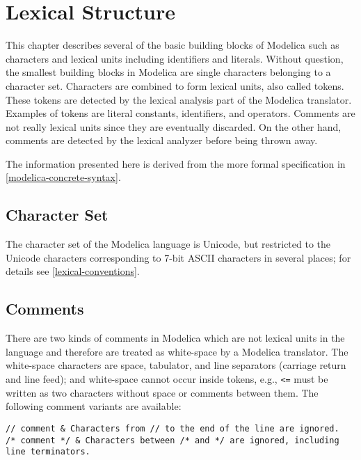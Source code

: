 \chapter{Lexical Structure}\label{lexical-structure}

This chapter describes several of the basic building blocks of Modelica
such as characters and lexical units including identifiers and literals.
Without question, the smallest building blocks in Modelica are single
characters belonging to a character set. Characters are combined to form
lexical units, also called tokens. These tokens are detected by the
lexical analysis part of the Modelica translator. Examples of tokens are
literal constants, identifiers, and operators. Comments are not really
lexical units since they are eventually discarded. On the other hand,
comments are detected by the lexical analyzer before being thrown away.

The information presented here is derived from the more formal
specification in \cref{modelica-concrete-syntax}.

\section{Character Set}\label{character-set}

The character set of the Modelica language is Unicode, but restricted to
the Unicode characters corresponding to 7-bit ASCII characters in
several places; for details see \cref{lexical-conventions}.

\section{Comments}\label{comments}

There are two kinds of comments in Modelica which are not lexical units in the language and therefore are treated as white-space by a Modelica translator.
The white-space characters are space, tabulator, and line separators (carriage return and line feed); and white-space cannot occur inside tokens, e.g., \lstinline!<=! must be written as two characters without space or comments between them.
The following comment variants are available:
\begin{lstlisting}[language=modelica]
// comment & Characters from // to the end of the line are ignored.
/* comment */ & Characters between /* and */ are ignored, including line terminators.
\end{lstlisting}

